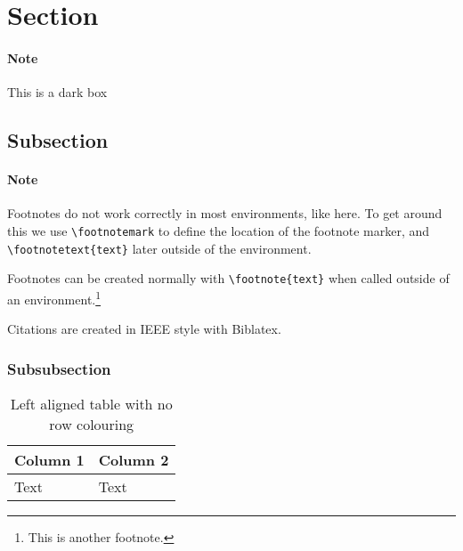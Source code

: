 \clearpage

\section{Section}
\begin{tcolorbox}[colback=gray!50,enhanced,boxrule=0pt,frame hidden]
    \paragraph{Note} This is a dark box
\end{tcolorbox}

\subsection{Subsection}
\begin{tcolorbox}[colback=gray!5, breakable, enhanced]
    \paragraph{Note}
    Footnotes do not work correctly in most environments, like here. To get around this we use \verb|\footnotemark| to define the location of the footnote marker, and \verb|\footnotetext{text}| later outside of the environment.\footnotemark
\end{tcolorbox}

Footnotes can be created normally with \verb|\footnote{text}| when called outside of an environment.\footnote{This is another footnote.}

Citations are created in IEEE style with Biblatex.\cite{example2}

\subsubsection{Subsubsection}

{%
\captionsetup{justification=raggedright,singlelinecheck=false}
\begin{table}[h]
  \begin{tabularx}{0.3\textwidth}{lX}
    Column 1 & Column 2\\
    \midrule
    Text     & Text\\
    \midrule
  \end{tabularx}
  \caption{Left aligned table with no row colouring}
\end{table}
}


